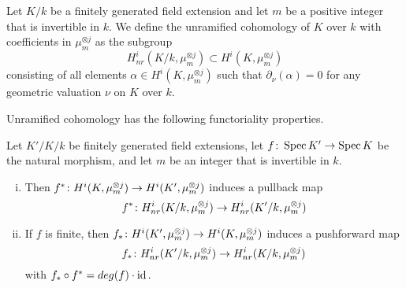 \begin{definition}{{\cite[Definition 4.3]{SchreiederCyclesAndRationality}}}
  Let $K/k$ be a finitely generated field extension and let $m$ be a positive integer that is invertible in $k$. We define the unramified cohomology of $K$ over $k$ with coefficients in $\mu_m^{\otimes j}$ as the subgroup
  \[H_{nr}^i(K/k,\mu_m^{\otimes j}) \subset H^i(K,\mu_m^{\otimes j}) \]
consisting of all elements $\alpha \in H^i(K,\mu_m^{\otimes j})$ such that $\partial_\nu (\alpha) = 0$ for any geometric valuation $\nu$ on $K$ over $k$.
\end{definition}


Unramified cohomology has the following functoriality properties.
\begin{proposition}{{\cite[Proposition 4.7]{SchreiederCyclesAndRationality}}}
	Let $K'/K/k$ be finitely generated field extensions, let $f \colon \operatorname{Spec} K' \to \operatorname{Spec} K$ be the natural morphism, and let $m$ be an integer that is invertible in $k$.
	\begin{enumerate}[i)]
		\item Then $f^* \colon H^i(K,\mu_m^{\otimes j}) \to H^i(K',\mu_m^{\otimes j})$ induces a pullback map
		\[f^* \colon H_{nr}^i(K/k,\mu_m^{\otimes j}) \to H_{nr}^i(K'/k,\mu_m^{\otimes j}) \]
		\item If $f$ is finite, then $f_* \colon H^i(K',\mu_m^{\otimes j}) \to H^i(K,\mu_m^{\otimes j})$ induces a pushforward map
		\[f_* \colon H_{nr}^i(K'/k,\mu_m^{\otimes j}) \to H_{nr}^i(K/k,\mu_m^{\otimes j})\]
		with $f_* \circ f^* = deg(f) \cdot \operatorname{id}.$
	\end{enumerate}
\end{proposition}


